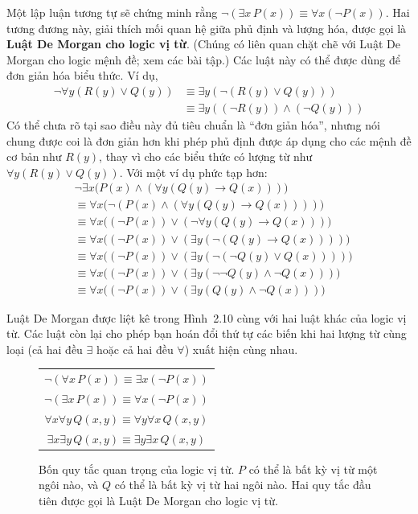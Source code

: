 Một lập luận tương tự sẽ chứng minh rằng $\neg(\exists x\, P(x)) \equiv \forall x(\neg P(x))$. Hai tương đương này, giải thích mối quan hệ giữa phủ định và lượng hóa, được gọi là \textbf{Luật De Morgan cho logic vị từ}. (Chúng có liên quan chặt chẽ với Luật De Morgan cho logic mệnh đề; xem các bài tập.) Các luật này có thể được dùng để đơn giản hóa biểu thức. Ví dụ,
\begin{align*}
\neg \forall y(R(y) \lor Q(y)) &\equiv \exists y(\neg(R(y) \lor Q(y))) \\
&\equiv \exists y((\neg R(y)) \land (\neg Q(y)))
\end{align*}
Có thể chưa rõ tại sao điều này đủ tiêu chuẩn là ``đơn giản hóa'', nhưng nói chung được coi là đơn giản hơn khi phép phủ định được áp dụng cho các mệnh đề cơ bản như $R(y)$, thay vì cho các biểu thức có lượng từ như $\forall y(R(y) \lor Q(y))$. Với một ví dụ phức tạp hơn:
\begin{align*}
&\neg \exists x\big(P(x) \land (\forall y(Q(y) \to Q(x)))\big) \\
&\equiv \forall x\big(\neg(P(x) \land (\forall y(Q(y) \to Q(x))))\big) \\
&\equiv \forall x\big((\neg P(x)) \lor (\neg \forall y(Q(y) \to Q(x)))\big) \\
&\equiv \forall x\big((\neg P(x)) \lor (\exists y(\neg(Q(y) \to Q(x))))\big) \\
&\equiv \forall x\big((\neg P(x)) \lor (\exists y(\neg(\neg Q(y) \lor Q(x))))\big) \\
&\equiv \forall x\big((\neg P(x)) \lor (\exists y(\neg\neg Q(y) \land \neg Q(x)))\big) \\
&\equiv \forall x\big((\neg P(x)) \lor (\exists y(Q(y) \land \neg Q(x)))\big)
\end{align*}

Luật De Morgan được liệt kê trong Hình~2.10 cùng với hai luật khác của logic vị từ. Các luật còn lại cho phép bạn hoán đổi thứ tự các biến khi hai lượng từ cùng loại (cả hai đều $\exists$ hoặc cả hai đều $\forall$) xuất hiện cùng nhau.

\begin{figure}[h]
\centering
\begin{tabular}{|c|}
\hline
$\neg(\forall x\, P(x)) \equiv \exists x(\neg P(x))$ \\
$\neg(\exists x\, P(x)) \equiv \forall x(\neg P(x))$ \\
$\forall x \forall y\, Q(x,y) \equiv \forall y \forall x\, Q(x,y)$ \\
$\exists x \exists y\, Q(x,y) \equiv \exists y \exists x\, Q(x,y)$ \\
\hline
\end{tabular}
\caption{Bốn quy tắc quan trọng của logic vị từ. $P$ có thể là bất kỳ vị từ một ngôi nào, và $Q$ có thể là bất kỳ vị từ hai ngôi nào. Hai quy tắc đầu tiên được gọi là Luật De Morgan cho logic vị từ.}
\end{figure}

